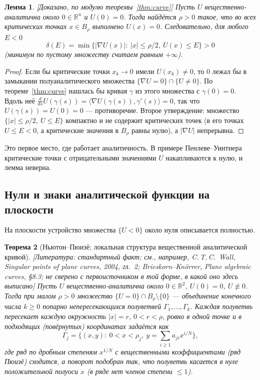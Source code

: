 \documentclass[11pt,a4paper]{article}
\newtheorem{theorem}{Теорема}[section]
\newtheorem{lemma}[theorem]{Лемма}
\theoremstyle{definition}
\newcommand{\R}{\mathbb R}
\newcommand{\mk}[1]{\textsf{[#1]}}
\newcommand{\term}[1]{\emph{#1}}
\begin{document}
\begin{lemma}\label{lem:critval}
\mk{Доказано, по модулю теоремы~\ref{thm:curve}} Пусть $U$ вещественно-аналитична около $0\in\R^n$
и $U(0)=0$. Тогда найдётся $\rho>0$ такое, что во всех критических точках $x\in B_\rho$
выполнено $U(x)=0$. Следовательно, для любого $E<0$
\[
\delta(E)=\min\{|\nabla U(x)|:\ |x|\le\rho/2,\ U(x)\le E\}>0
\]
(минимум по пустому множеству считаем равным $+\infty$).
\end{lemma}
\begin{proof}
Если бы критические точки $x_k\to0$ имели $U(x_k)\ne0$, то $0$ лежал бы в замыкании
полуаналитического множества $\{\nabla U=0\}\cap\{U\ne0\}$. По теореме~\ref{thm:curve} нашлась бы
кривая $\gamma$ из этого множества с $\gamma(0)=0$. Вдоль неё
$\frac{d}{ds}U(\gamma(s))=\langle\nabla U(\gamma(s)),\gamma'(s)\rangle=0$, так что
$U(\gamma(s))=U(0)=0$ --- противоречие. Второе утверждение: множество
$\{|x|\le\rho/2,\ U\le E\}$ компактно и не содержит критических точек (в его точках $U\le E<0$,
а критические значения в $B_\rho$ равны нулю), а $|\nabla U|$ непрерывна.
\end{proof}

Это первое место, где работает аналитичность. В примере Пенлеве--Уинтнера критические точки с
отрицательными значениями $U$ накапливаются к нулю, и лемма неверна.

\subsection{Нули и знаки аналитической функции на плоскости}\label{subsec:puiseux}

На плоскости устройство множества $\{U<0\}$ около нуля описывается полностью.

\begin{theorem}[Ньютон--Пюизё; локальная структура вещественной аналитической кривой]\label{thm:puiseux}
\mk{Литература: стандартный факт; см., например, C.\,T.\,C.~Wall, Singular points of plane curves,
2004, гл.~2; Brieskorn--Knörrer, Plane algebraic curves, §8.3; не сверено с первоисточником
в той форме, в какой оно здесь выписано} Пусть $U$ вещественно-аналитична около $0\in\R^2$,
$U(0)=0$, $U\not\equiv0$. Тогда при малом $\rho>0$ множество $\{U=0\}\cap B_\rho\setminus\{0\}$
--- объединение конечного числа $k\ge0$ попарно непересекающихся \term{полуветвей}
$\Gamma_1,\dots,\Gamma_k$. Каждая полуветвь пересекает каждую окружность $|x|=r$, $0<r<\rho$,
ровно в одной точке и в подходящих (повёрнутых) координатах задаётся как
\[
\Gamma_j=\{(x,y):\ 0<x<\rho_j,\ y=\textstyle\sum_{i\ge1}a_{ji}x^{i/N}\},
\]
где ряд по дробным степеням $x^{1/N}$ с \emph{вещественными} коэффициентами (\term{ряд Пюизё})
сходится, а поворот подобран так, что полуветвь касается в нуле положительной полуоси $x$ (в ряде
нет членов степени $\le1$).
\end{theorem}
\end{document}
